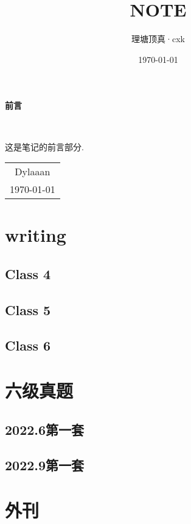 \documentclass[12pt, a4paper, oneside]{ctexbook}
\title{{\Huge{\textbf{NOTE}}}\\}
\author{理塘顶真·cxk}
\date{\today}
\begin{document}
\maketitle

\setcounter{page}{1}

\begin{center}
    \Huge\textbf{前言}
\end{center}~\

这是笔记的前言部分. 
~\\
\begin{flushright}
    \begin{tabular}{c}
        Dylaaan\\
        \today
    \end{tabular}
\end{flushright}

\newpage
{}
\setcounter{page}{1}
\tableofcontents
\newpage
\setcounter{page}{1}

\chapter{writing}
\section{Class 4}

\section{Class 5}

\section{Class 6}


\chapter{六级真题}
\section{2022.6第一套}

\section{2022.9第一套}


\chapter{外刊}
\end{document}

